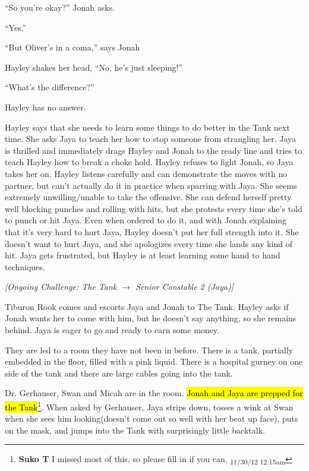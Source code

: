 ``So you're okay?'' Jonah asks.

``Yes.''

``But Oliver's in a coma,'' says Jonah

Hayley shakes her head, ``No, he's just sleeping!''

``What's the difference?''

Hayley has no answer.



Hayley says that she needs to learn some things to do better in the Tank next time.  She asks Jaya to teach her how to stop someone from strangling her.  Jaya is thrilled and immediately drags Hayley and Jonah to the ready line and tries to teach Hayley how to break a choke hold.  Hayley refuses to fight Jonah, so Jaya takes her on.  Hayley listens carefully and can demonstrate the moves with no partner, but can't actually do it in practice when sparring with Jaya.  She seems extremely unwilling/unable to take the offensive. She can defend herself pretty well blocking punches and rolling with hits, but she protests every time she's told to punch or hit Jaya.    Even when ordered to do it, and with Jonah explaining that it's very hard to hurt Jaya, Hayley doesn't put her full strength into it.  She doesn't want to hurt Jaya, and she apologizes every time she lands any kind of hit.  Jaya gets frustrated, but Hayley is at least learning some hand to hand techniques.  



\textit{{[}Ongoing Challenge: The Tank $\rightarrow$ Senior Constable 2 (Jaya){]}}



Tiburon Rook comes and escorts Jaya and Jonah to The Tank.  Hayley asks if Jonah wants her to come with him, but he doesn't say anything, so she remains behind.  Jaya is eager to go and ready to earn some money.



They are led to a room they have not been in before.  There is a tank, partially embedded in the floor, filled with a pink liquid.  There is a hospital gurney on one side of the tank and there are large cables going into the tank.



Dr. Gerhauser, Swan and Micah are in the room.  \hl{Jonah and Jaya are prepped for the Tank}\footnote{\textbf{Suko T }I missed most of this, so please fill in if you can. \textsubscript{11/30/12 12:15am}}.  When asked by Gerhauser, Jaya strips down, tosses a wink at Swan when she sees him looking(doesn't come out so well with her beat up face), puts on the mask, and jumps into the Tank with surprisingly little backtalk.  





